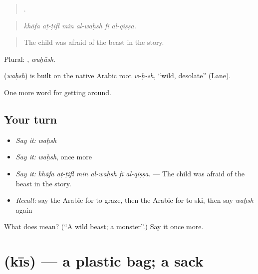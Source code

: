 \begin{quote}
     .
\end{quote}

\begin{quote}
\emph{khāfa aṭ-ṭifl min al-waḥsh fī al-qiṣṣa.}
\end{quote}

\begin{quote}
The child was afraid of the beast in the story.
\end{quote}

Plural: , \emph{wuḥūsh}.

\begin{cousinweb}
\textbf{} (\emph{waḥsh}) is built on the native Arabic root \emph{w-ḥ-sh}, \textquotedblleft{}wild, desolate\textquotedblright{} (Lane).
\end{cousinweb}

\begin{grammarlens}[title={What you've built}]
One more word for getting around.
\end{grammarlens}

\subsection*{Your turn}
\begin{itemize}
\raggedright
  \item \emph{Say it:} \emph{waḥsh}
  \item \emph{Say it:} \emph{waḥsh}, once more
  \item \emph{Say it:} \emph{khāfa aṭ-ṭifl min al-waḥsh fī al-qiṣṣa.} — The child was afraid of the beast in the story.
  \item \emph{Recall:} say the Arabic for to graze, then the Arabic for to ski, then say \emph{waḥsh} again
\end{itemize}

\begin{tcolorbox}[breakable,colback=teal!4,colframe=teal!35!black,title={Before you move on}]
What does  mean? (\textquotedblleft{}A wild beast; a monster\textquotedblright{}.) Say it once more.
\end{tcolorbox}
\section[\texorpdfstring{\ar{كيس} (kīs)}{كيس (kīs)}]{ (kīs) — a plastic bag; a sack}

